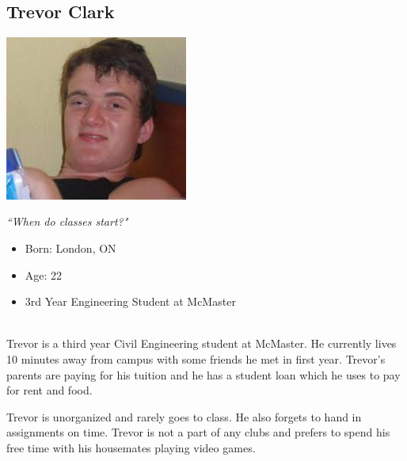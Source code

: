 \documentclass[10pt]{article}
\begin{document}

\subsection*{Trevor Clark}

\begin{minipage}{60mm}
\includegraphics[width=60mm]{Trevor.jpg}
\begin{center}
\emph{``When do classes start?"}
\end{center}
\end{minipage}
\begin{minipage}{\textwidth}
\begin{itemize}
\item Born: London, ON
\item Age: 22
\item 3rd Year Engineering Student at McMaster
\end{itemize}
\end{minipage}\\

Trevor is a third year Civil Engineering student at McMaster. He currently lives 10 minutes away from campus with some friends he met in first year. Trevor's parents are paying for his tuition and he has a student loan which he uses to pay for rent and food.

Trevor is unorganized and rarely goes to class. He also forgets to hand in assignments on time. Trevor is not a part of any clubs and prefers to spend his free time with his housemates playing video games.
\end{document}
